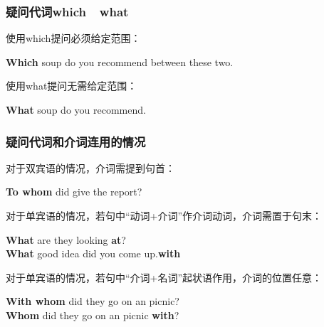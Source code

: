\documentclass[UTF8]{ctexart}
\newcommand{\littf}[1]{{\hspace{3pt}\ttfamily #1}}
\begin{document}
\subsubsection{疑问代词\littf{which}~~\littf{what}}
    使用\littf{which}提问必须给定范围：
    \begin{center}
        \large\ttfamily
        \textbf{Which} soup do you recommend between these two.\\[4mm]
    \end{center}
    使用\littf{what\hphantom{x}}提问无需给定范围：
    \begin{center}
        \large\ttfamily
        \textbf{What} soup do you recommend.
    \end{center}

\newpage

\subsubsection{疑问代词和介词连用的情况}
    对于双宾语的情况，介词需提到句首：
    \begin{center}
        \large\ttfamily
        \textbf{To whom} did give the report?\\[6mm]
    \end{center}
    对于单宾语的情况，若句中“动词+介词”作介词动词，介词需置于句末：
    \begin{center}
        \large\ttfamily
        \textbf{What} are they looking \textbf{at}?\\[3mm]
        \textbf{What} good idea did you come up.\textbf{with}\\[6mm]
    \end{center}
    对于单宾语的情况，若句中“介词+名词”起状语作用，介词的位置任意：
    \begin{center}
        \large\ttfamily
        \textbf{With whom} did they go on an picnic?\\[3mm]
        \textbf{Whom} did they go on an picnic \textbf{with}?\\[6mm]
    \end{center}\vspace{5pt}
\end{document}
